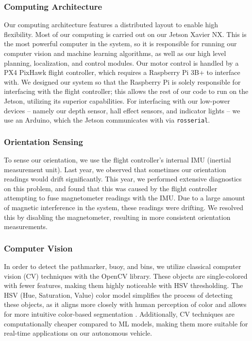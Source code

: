 \documentclass[conference]{IEEEtran}
\begin{document}
\subsubsection{Computing Architecture}
\label{sssec:comp_arch}
Our computing architecture features a distributed layout to enable high flexibility. Most of our computing is carried out on our Jetson Xavier NX. This is the most powerful computer in the system, so it is responsible for running our computer vision and machine learning algorithms, as well as our high level planning, localization, and control modules. Our motor control is handled by a PX4 PixHawk flight controller, which requires a Raspberry Pi 3B+ to interface with. We designed our system so that the Raspberry Pi is solely responsible for interfacing with the flight controller; this allows the rest of our code to run on the Jetson, utilizing its superior capabilities. For interfacing with our low-power devices – namely our depth sensor, hall effect sensors, and indicator lights – we use an Arduino, which the Jetson communicates with via \verb|rosserial|.

\subsubsection{Orientation Sensing}
\label{sssec:orientation_sensing}
To sense our orientation, we use the flight controller’s internal IMU (inertial measurement unit). Last year, we observed that sometimes our orientation readings would drift significantly. This year, we performed extensive diagnostics on this problem, and found that this was caused by the flight controller attempting to fuse magnetometer readings with the IMU. Due to a large amount of magnetic interference in the system, these readings were drifting. We resolved this by disabling the magnetometer, resulting in  more consistent orientation measurements.

\subsubsection{Computer Vision}
\label{sssec:cv}
In order to detect the pathmarker, buoy, and bins, we utilize classical computer vision (CV) techniques with the OpenCV library. These objects are single-colored with fewer features, making them highly noticeable with HSV thresholding. The HSV (Hue, Saturation, Value) color model simplifies the process of detecting these objects, as it aligns more closely with human perception of color and allows for more intuitive color-based segmentation \cite{b2}. Additionally, CV techniques are computationally cheaper compared to ML models, making them more suitable for real-time applications on our autonomous vehicle.
\end{document}
